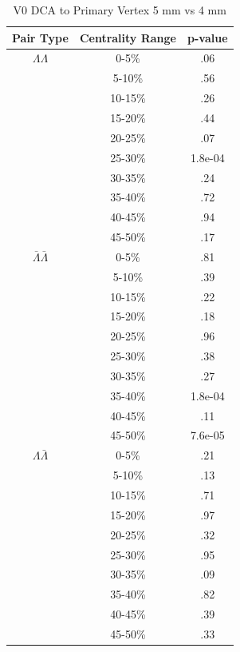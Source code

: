 \begin{table}
\begin{minipage}{18pc}
\caption {V0 DCA to Primary Vertex 5 mm vs 4 mm} \label{tab:V0DcaPrimVertPvalueTests5mmVs4mm} 
\begin{center}
\begin{tabular}{| c | c | c |}
  \hline                       
  Pair Type & Centrality Range & p-value \\
  \hline
  $\Lambda\Lambda$ & 0-5\% & .06  \\
   & 5-10\%  & .56 \\
   & 10-15\% & .26 \\
   & 15-20\% & .44 \\
   & 20-25\% & .07 \\
   & 25-30\% & 1.8e-04 \\
   & 30-35\% & .24 \\
   & 35-40\% & .72 \\
   & 40-45\% & .94 \\
   & 45-50\% & .17 \\
   \hline
  $\bar{\Lambda}\bar{\Lambda}$ &  0-5\% & .81 \\
   & 5-10\% & .39 \\
   & 10-15\% & .22 \\
   & 15-20\% & .18 \\
   & 20-25\% & .96 \\
   & 25-30\% & .38 \\
   & 30-35\% & .27 \\
   & 35-40\% & 1.8e-04 \\
   & 40-45\% & .11 \\
   & 45-50\% & 7.6e-05 \\
   \hline
  $\Lambda\bar{\Lambda}$ &  0-5\% & .21 \\
   & 5-10\% & .13 \\
   & 10-15\% & .71 \\
   & 15-20\% & .97 \\
   & 20-25\% & .32 \\
   & 25-30\% & .95 \\
   & 30-35\% & .09 \\
   & 35-40\% & .82 \\
   & 40-45\% & .39 \\
   & 45-50\% & .33 \\
  \hline  
\end{tabular}

\end{center}
\end{minipage}
\end{table}
